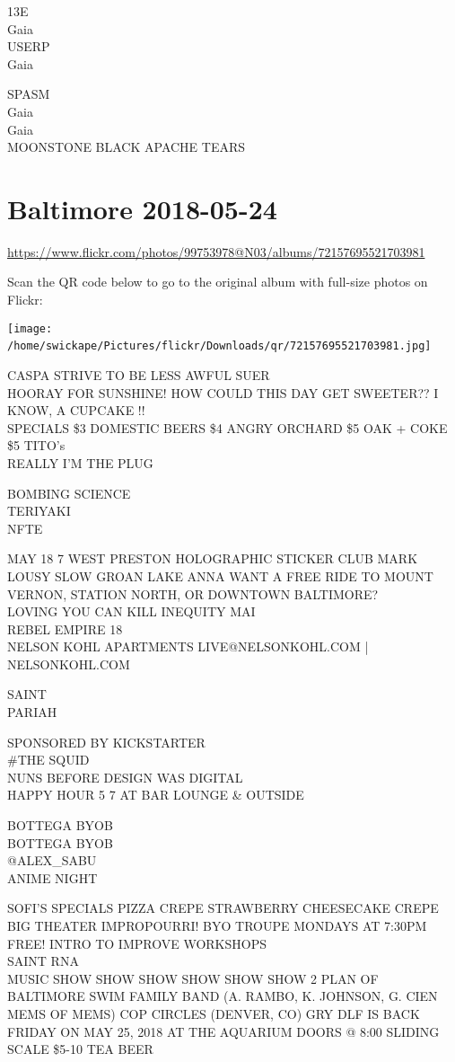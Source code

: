 \documentclass[10pt,letterpaper]{article}
\begin{document}
13E\\
Gaia\\
USERP\\
Gaia

SPASM\\
Gaia\\
Gaia\\
MOONSTONE BLACK APACHE TEARS
\

\section*{Baltimore 2018-05-24}

\url{https://www.flickr.com/photos/99753978@N03/albums/72157695521703981}

Scan the QR code below to go to the original album with full-size photos on Flickr:

\texttt{[image: /home/swickape/Pictures/flickr/Downloads/qr/72157695521703981.jpg]}
\

CASPA STRIVE TO BE LESS AWFUL SUER\\
HOORAY FOR SUNSHINE!  HOW COULD THIS DAY GET SWEETER??  I KNOW, A CUPCAKE !!\\
SPECIALS \$3 DOMESTIC BEERS \$4 ANGRY ORCHARD \$5 OAK + COKE \$5 TITO's\\
REALLY I'M THE PLUG

BOMBING SCIENCE\\
TERIYAKI\\
NFTE

MAY 18 7 WEST PRESTON HOLOGRAPHIC STICKER CLUB MARK LOUSY SLOW GROAN LAKE ANNA WANT A FREE RIDE TO MOUNT VERNON, STATION NORTH, OR DOWNTOWN BALTIMORE?\\
LOVING YOU CAN KILL INEQUITY MAI\\
REBEL EMPIRE 18\\
NELSON KOHL APARTMENTS LIVE@NELSONKOHL.COM | NELSONKOHL.COM

SAINT\\
PARIAH

SPONSORED BY KICKSTARTER\\
\#THE SQUID\\
NUNS BEFORE DESIGN WAS DIGITAL\\
HAPPY HOUR 5 7 AT BAR LOUNGE \& OUTSIDE

BOTTEGA BYOB\\
BOTTEGA BYOB\\
@ALEX\_SABU\\
ANIME NIGHT

SOFI'S SPECIALS PIZZA CREPE STRAWBERRY CHEESECAKE CREPE\\
BIG THEATER IMPROPOURRI! BYO TROUPE MONDAYS AT 7:30PM FREE! INTRO TO IMPROVE WORKSHOPS\\
SAINT RNA\\
MUSIC SHOW SHOW SHOW SHOW SHOW SHOW 2 PLAN OF BALTIMORE SWIM FAMILY BAND (A. RAMBO, K. JOHNSON, G. CIEN MEMS OF MEMS) COP CIRCLES (DENVER, CO) GRY DLF IS BACK FRIDAY ON MAY 25, 2018 AT THE AQUARIUM DOORS @ 8:00 SLIDING SCALE \$5{-}10 TEA BEER
\end{document}
